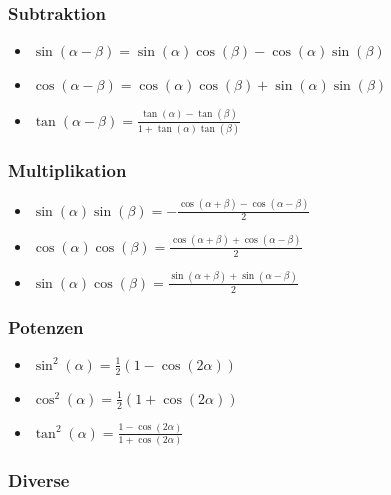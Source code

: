 \documentclass[8pt]{extarticle}
\begin{document}
\begin{multicols*}{3}
\subsubsection{Subtraktion}
\begin{itemize}
 \item $\sin(\alpha - \beta) = \sin(\alpha) \cos(\beta) - \cos(\alpha)\sin(\beta)$
 \item $\cos(\alpha - \beta) = \cos(\alpha) \cos(\beta) + \sin(\alpha)\sin(\beta)$
 \item $\tan(\alpha - \beta) = \frac{\tan(\alpha) - \tan(\beta)}{1+\tan(\alpha) \tan(\beta)}$
\end{itemize}

\subsubsection{Multiplikation}
\begin{itemize}
 \item $\sin(\alpha) \sin(\beta) = -\frac{\cos(\alpha + \beta) - \cos(\alpha - \beta)}{2}$
 \item $\cos(\alpha) \cos(\beta) =  \frac{\cos(\alpha + \beta) + \cos(\alpha - \beta)}{2}$
 \item $\sin(\alpha) \cos(\beta) =  \frac{\sin(\alpha + \beta) + \sin(\alpha - \beta)}{2}$
\end{itemize}

\subsubsection{Potenzen}
\begin{itemize}
 \item $\sin^2(\alpha) = \frac{1}{2}(1-\cos(2\alpha))$
 \item $\cos^2(\alpha) = \frac{1}{2}(1+\cos(2\alpha))$
 \item $\tan^2(\alpha) = \frac{1-\cos(2\alpha)}{1+\cos(2\alpha)}$
\end{itemize}

\subsubsection{Diverse}


\end{multicols*}
\end{document}

